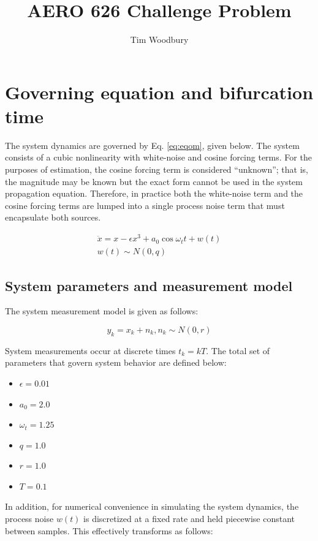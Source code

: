 \documentclass[]{article}
\title{AERO 626 Challenge Problem}
\author{Tim Woodbury}
\begin{document}

\maketitle

\section{Governing equation and bifurcation time}

The system dynamics are governed by Eq. \ref{eq:eqom}, given below. The system consists of a cubic nonlinearity with white-noise and cosine forcing terms. For the purposes of estimation, the cosine forcing term is considered ``unknown''; that is, the magnitude may be known but the exact form cannot be used in the system propagation equation. Therefore, in practice both the white-noise term and the cosine forcing terms are lumped into a single process noise term that must encapsulate both sources.

\begin{align}
\ddot{x} = x - \epsilon x^3 + a_0 \cos{\omega_t t} + w(t) \label{eq:eqom} \\
w(t) \sim N(0,q)
\end{align}

\subsection{System parameters and measurement model}

The system measurement model is given as follows:

\begin{equation}
y_k = x_k + n_k, n_k \sim N(0,r)
\end{equation}

System measurements occur at discrete times $t_k = kT$. The total set of parameters that govern system behavior are defined below:

\begin{itemize}
\item $\epsilon = 0.01$
\item $a_0 = 2.0$
\item $\omega_t = 1.25$
\item $q = 1.0$
\item $r = 1.0$
\item $T = 0.1$
\end{itemize}

In addition, for numerical convenience in simulating the system dynamics, the process noise $w(t)$ is discretized at a fixed rate and held piecewise constant between samples. This effectively transforms as follows:
\end{document}
